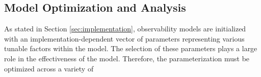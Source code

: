 \subsection{Model Optimization and Analysis}

As stated in Section \ref{sec:implementation}, observability models are initialized with an implementation-dependent vector of parameters representing various tunable factors within the model. The selection of these parameters plays a large role in the effectiveness of the model. Therefore, the parameterization must be optimized across a variety of 

\subsubsection{}